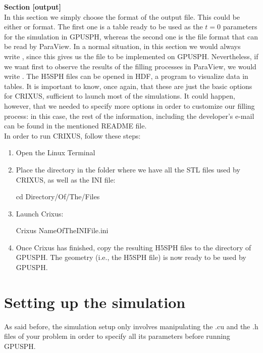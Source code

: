 \documentclass{../GPUSPHtemplate}
\begin{document}
\textbf{Section [output]}\\
In this section we simply choose the format of the output file. 
This could be either  or  format. 
The first one is a table ready to be used as the $t=0$ 
parameters for the simulation in GPUSPH, whereas the second 
one is the file format that can be read by ParaView. 
In a normal situation, in this section we would 
always write , since this gives us the file 
to be implemented on GPUSPH. Nevertheless, if we want first 
to observe the results of the filling processes in ParaView, 
we would write . 
The H5SPH files can be opened in HDF, a program to visualize data in tables.
It is important to know, once again, that these are just the basic options for CRIXUS, 
sufficient to launch most of the simulations. 
It could happen, however, that we needed to specify more options 
in order to customize our filling process: in this case, 
the rest of the information, including the developer’s e-mail 
can be found in the mentioned README file.\\

In order to run CRIXUS, follow these steps:
\begin{enumerate}
\item Open the Linux Terminal
\item Place the directory in the folder where we 
have all the STL files used by CRIXUS, as well as the INI file:
\begin{shellcode}
cd Directory/Of/The/Files
\end{shellcode}
\item Launch Crixus:
\begin{shellcode}
Crixus NameOfTheINIFile.ini
\end{shellcode}
\item Once Crixus has finished, copy the resulting H5SPH files to the  directory of GPUSPH. 
The geometry (i.e., the H5SPH file) is now ready to be used by GPUSPH.
\end{enumerate}

\section{Setting up the simulation}

As said before, the simulation setup only involves manipulating the .cu and the .h 
files of your problem in order to specify all its parameters before running GPUSPH. 
\end{document}
